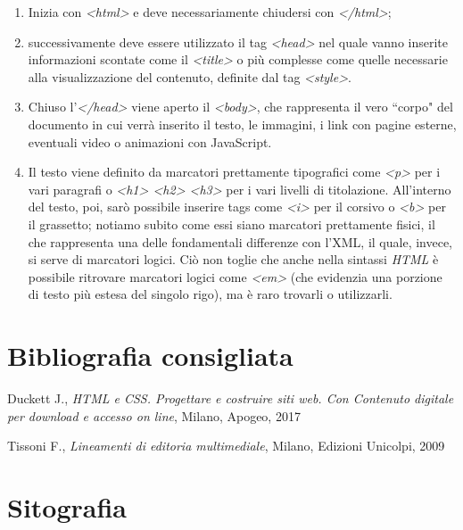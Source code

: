 \documentclass[
  b5paper,
  twoside,
  12pt,
  chapterprefix=false,
  bibliography=totocnumbered,
  parskip=false]{scrbook}
\begin{document}
\begin{enumerate}
\def\labelenumi{\arabic{enumi}.}
\item
  Inizia con \emph{\textless html\textgreater{}} e deve necessariamente chiudersi con
  \emph{\textless/html\textgreater{}};
\item
  successivamente deve essere utilizzato il tag \emph{\textless head\textgreater{}} nel quale
  vanno inserite informazioni scontate come il \emph{\textless title\textgreater{}} o più
  complesse come quelle necessarie alla visualizzazione del contenuto,
  definite dal tag \emph{\textless style\textgreater{}}.
\item
  Chiuso l'\emph{\textless/head\textgreater{}} viene aperto il \emph{\textless body\textgreater{}}, che rappresenta il
  vero ``corpo" del documento in cui verrà inserito il testo, le
  immagini, i link con pagine esterne, eventuali video o animazioni
  con JavaScript.
\item
  Il testo viene definito da marcatori prettamente tipografici come
  \emph{\textless p\textgreater{}} per i vari paragrafi o \emph{\textless h1\textgreater{} \textless h2\textgreater{} \textless h3\textgreater{}} per i vari
  livelli di titolazione. All'interno del testo, poi, sarò possibile
  inserire tags come \emph{\textless i\textgreater{}} per il corsivo o \emph{\textless b\textgreater{}} per il
  grassetto; notiamo subito come essi siano marcatori prettamente
  fisici, il che rappresenta una delle fondamentali differenze con
  l'XML, il quale, invece, si serve di marcatori logici. Ciò non
  toglie che anche nella sintassi \emph{HTML} è possibile ritrovare
  marcatori logici come \emph{\textless em\textgreater{}} (che evidenzia una porzione di testo
  più estesa del singolo rigo), ma è raro trovarli o utilizzarli.
\end{enumerate}

\hypertarget{bibliografia-consigliata-12}{%
\section*{Bibliografia consigliata}\label{bibliografia-consigliata-12}}

Duckett J., \emph{HTML e CSS. Progettare e costruire siti web. Con Contenuto
digitale per download e accesso on line}, Milano, Apogeo, 2017

Tissoni F., \emph{Lineamenti di editoria multimediale}, Milano, Edizioni
Unicolpi, 2009

\hypertarget{sitografia-18}{%
\section*{Sitografia}\label{sitografia-18}}
\end{document}
